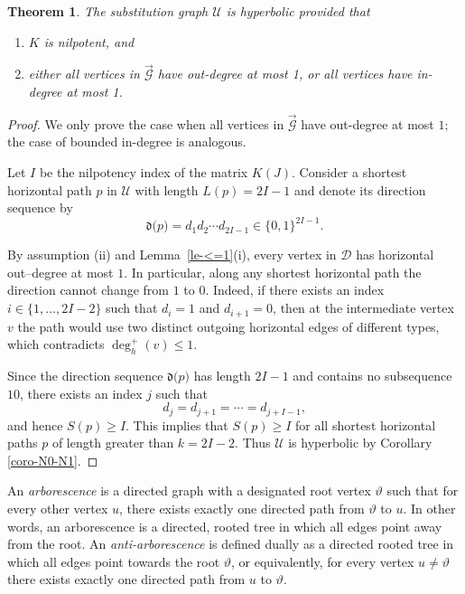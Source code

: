 \documentclass[reqno]{amsart}
\newtheorem{theorem}{Theorem}
\theoremstyle{plain}
\numberwithin{equation}{section}
\begin{document}
\begin{theorem}
\label{th-degree}The substitution graph $\mathcal{U}$ is hyperbolic provided
that

\begin{enumerate}
\item[(i)] $K$ is nilpotent, and

\item[(ii)] either all vertices in $\overrightarrow{\mathcal{G}}$ have
out-degree at most 1, or all vertices have in-degree at most 1.
\end{enumerate}
\end{theorem}

\begin{proof}
We only prove the case when all vertices in $\overrightarrow{\mathcal{G}}$
have out-degree at most $1;$ the case of bounded in-degree is analogous.

Let $I$ be the nilpotency index of the matrix $K(J)$. Consider a shortest
horizontal path $p$ in $\mathcal{U}$ with length $L(p)=2I-1$ and denote its
direction sequence by%
\begin{equation*}
\mathfrak{d(}p)=d_{1}d_{2}\cdots d_{2I-1}\in \{0,1\}^{2I-1}.
\end{equation*}

By assumption (ii) and Lemma~\ref{le-<=1}(i), every vertex in $\mathcal{D}$
has horizontal out--degree at most $1$. In particular, along any shortest
horizontal path the direction cannot change from $1$ to $0$. Indeed, if
there exists an index $i\in \{1,\dots ,2I-2\}$ such that $d_{i}=1$ and $%
d_{i+1}=0$, then at the intermediate vertex $v$ the path would use two
distinct outgoing horizontal edges of different types, which contradicts $%
\deg _{h}^{+}(v)\leq 1$.

Since the direction sequence $\mathfrak{d(}p)$ has length $2I-1$ and
contains no subsequence $10$, there exists an index $j$ such that 
\begin{equation*}
d_{j}=d_{j+1}=\cdots =d_{j+I-1},
\end{equation*}%
and hence $S(p)\geq I.$ This implies that $S(p)\geq I$ for all shortest
horizontal paths $p$ of length greater than $k=2I-2.$ Thus $\mathcal{U}$ is
hyperbolic by Corollary \ref{coro-N0-N1}.
\end{proof}

An \emph{arborescence} is a directed graph with a designated root vertex $%
\vartheta $ such that for every other vertex $u$, there exists exactly one
directed path from $\vartheta $ to $u$. In other words, an arborescence is a
directed, rooted tree in which all edges point away from the root. An \emph{%
anti-arborescence} is defined dually as a directed rooted tree in which all
edges point towards the root $\vartheta $, or equivalently, for every vertex 
$u\neq \vartheta $ there exists exactly one directed path from $u$ to $%
\vartheta .$
\end{document}
